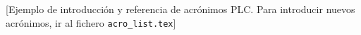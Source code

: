 [Ejemplo de introducción y referencia de acrónimos \ac{PLC}. Para introducir nuevos acrónimos, ir al fichero \texttt{acro\_list.tex}]

\begin{acronym}[MPC] %
\end{acronym}